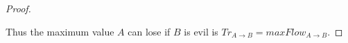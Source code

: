 \documentclass[11pt]{article}
\theoremstyle{definition}
\theoremstyle{corollary}
\theoremstyle{lemma}
\begin{document}
\begin{proof}
\begin{itemize}
       \end{itemize}
       Thus the maximum value $A$ can lose if $B$ is evil is $Tr_{A \rightarrow B} = maxFlow_{A \rightarrow B}$.

\end{proof}
\end{document}
